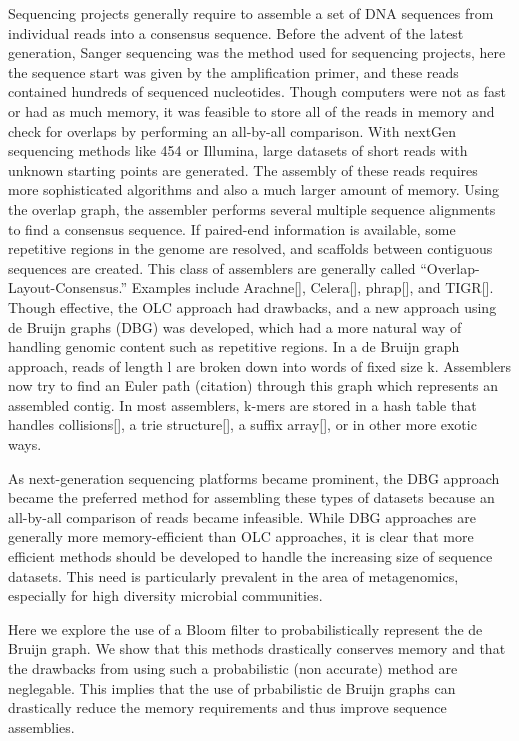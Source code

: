 \documentclass[12pt]{article} \usepackage{simplemargins}
\begin{document}
Sequencing projects generally require to assemble a set of DNA
sequences from individual reads into a consensus sequence. Before the
advent of the latest generation, Sanger sequencing was the method used
for sequencing projects, here the sequence start was given by the
amplification primer, and these reads contained hundreds of sequenced
nucleotides. Though computers were not as fast or had as much memory,
it was feasible to store all of the reads in memory and check for
overlaps by performing an all-by-all comparison. With nextGen
sequencing methods like 454 or Illumina, large datasets of short reads
with unknown starting points are generated. The assembly of these
reads requires more sophisticated algorithms and also a much larger
amount of memory. Using the overlap graph, the assembler performs
several multiple sequence alignments to find a consensus sequence. If
paired-end information is available, some repetitive regions in the
genome are resolved, and scaffolds between contiguous sequences are
created. This class of assemblers are generally called
“Overlap-Layout-Consensus.” Examples include Arachne[], Celera[],
phrap[], and TIGR[]. Though effective, the OLC approach had drawbacks,
and a new approach using de Bruijn graphs (DBG) was 
developed\cite{pmid11504945}, which
had a more natural way of handling genomic content such as repetitive
regions. In a de Bruijn graph approach, reads of length l are broken
down into words of fixed size k. Assemblers now try to find an Euler
path (citation) through this graph which represents an assembled
contig. In most assemblers, k-mers are stored in a hash table that
handles collisions[], a trie structure[], a suffix array[], or in
other more exotic ways.

As next-generation sequencing platforms became prominent, the DBG approach
became the preferred method for assembling these types of datasets
because an all-by-all comparison of reads became infeasible. While DBG
approaches are generally more memory-efficient than OLC approaches, it
is clear that more efficient methods should be developed to handle the
increasing size of sequence datasets. This need is particularly
prevalent in the area of metagenomics, especially for high diversity
microbial communities.

Here we explore the use of a Bloom filter to probabilistically
represent the de Bruijn graph. We show that this methods drastically
conserves memory and that the drawbacks from using such a
probabilistic (non accurate) method are neglegable. This implies that
the use of prbabilistic de Bruijn graphs can drastically reduce the
memory requirements and thus improve sequence assemblies.
\end{document}
